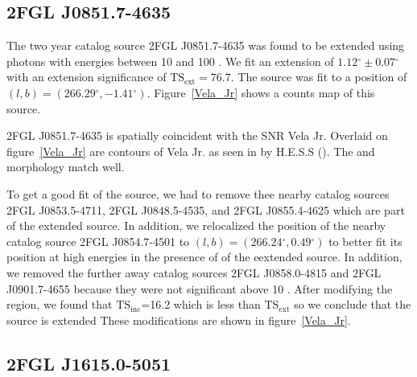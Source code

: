 \documentclass[12pt,preprint]{aastex}
\newcommand{\gev}{\text{GeV}\xspace}
\newcommand{\tev}{\text{TeV}\xspace}
\newcommand{\tsext}{{\ensuremath{\text{TS}_\text{ext}}}\xspace}
\newcommand{\tsinc}{\ensuremath{\text{TS}_\text{inc}}\xspace}
\renewcommand{\deg}{\ensuremath{^\circ}\xspace}
\begin{document}
\subsection{2FGL J0851.7-4635}
\label{section_2FGL_J0851.7-4635}


The two year catalog source 2FGL J0851.7-4635 was found to be
extended using photons with energies between 10 \gev and 100
\gev. We fit an extension of $1.12\deg\pm0.07\deg$ with an extension
significance of $\tsext=76.7$.  The source was fit to a position of
$(l,b)=(266.29\deg,-1.41\deg)$.  Figure~\ref{Vela_Jr} shows a counts
map of this source.

2FGL J0851.7-4635 is spatially coincident with the SNR Vela Jr.  Overlaid
on figure~\ref{Vela_Jr} are contours of Vela Jr. as seen in \tev by
H.E.S.S (\cite{vela_jr_hess}).  The \gev and \tev morphology match well.


To get a good fit of the source, we had to remove thee nearby catalog
sources 2FGL J0853.5-4711, 2FGL J0848.5-4535, and 2FGL J0855.4-4625
which are part of the extended source.  In addition, we relocalized
the position of the nearby catalog source 2FGL J0854.7-4501 to
$(l,b)=(266.24\deg,0.49\deg)$ to better fit its position at high energies
in the presence of of the eextended source.  In addition, we removed the
further away catalog sources 2FGL J0858.0-4815 and 2FGL J0901.7-4655
because they were not significant above 10 \gev.  After modifying
the region, we found that \tsinc=16.2 which is less than \tsext so we
conclude that the source is extended These modifications are shown in
figure~\ref{Vela_Jr}.


\subsection{2FGL J1615.0-5051}
\label{section_2FGL_J1615.0-5051}

\end{document}
